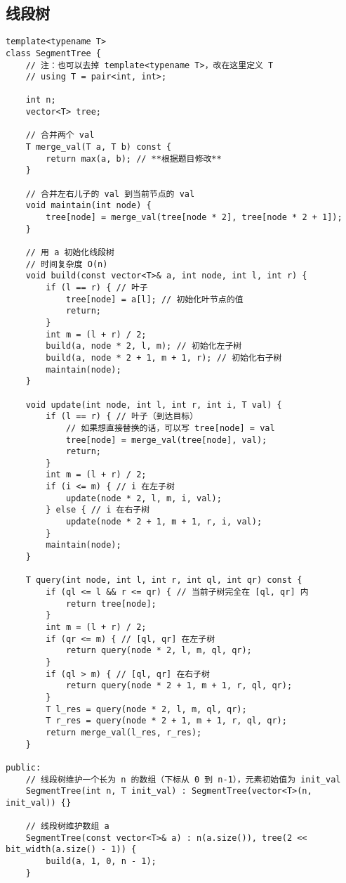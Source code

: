\documentclass[12pt,a4paper,UTF16]{ctexbook}
\theoremstyle{plain}
\begin{document}
\subsection{线段树}
\begin{lstlisting}
template<typename T>
class SegmentTree {
    // 注：也可以去掉 template<typename T>，改在这里定义 T
    // using T = pair<int, int>;

    int n;
    vector<T> tree;

    // 合并两个 val
    T merge_val(T a, T b) const {
        return max(a, b); // **根据题目修改**
    }

    // 合并左右儿子的 val 到当前节点的 val
    void maintain(int node) {
        tree[node] = merge_val(tree[node * 2], tree[node * 2 + 1]);
    }

    // 用 a 初始化线段树
    // 时间复杂度 O(n)
    void build(const vector<T>& a, int node, int l, int r) {
        if (l == r) { // 叶子
            tree[node] = a[l]; // 初始化叶节点的值
            return;
        }
        int m = (l + r) / 2;
        build(a, node * 2, l, m); // 初始化左子树
        build(a, node * 2 + 1, m + 1, r); // 初始化右子树
        maintain(node);
    }

    void update(int node, int l, int r, int i, T val) {
        if (l == r) { // 叶子（到达目标）
            // 如果想直接替换的话，可以写 tree[node] = val
            tree[node] = merge_val(tree[node], val);
            return;
        }
        int m = (l + r) / 2;
        if (i <= m) { // i 在左子树
            update(node * 2, l, m, i, val);
        } else { // i 在右子树
            update(node * 2 + 1, m + 1, r, i, val);
        }
        maintain(node);
    }

    T query(int node, int l, int r, int ql, int qr) const {
        if (ql <= l && r <= qr) { // 当前子树完全在 [ql, qr] 内
            return tree[node];
        }
        int m = (l + r) / 2;
        if (qr <= m) { // [ql, qr] 在左子树
            return query(node * 2, l, m, ql, qr);
        }
        if (ql > m) { // [ql, qr] 在右子树
            return query(node * 2 + 1, m + 1, r, ql, qr);
        }
        T l_res = query(node * 2, l, m, ql, qr);
        T r_res = query(node * 2 + 1, m + 1, r, ql, qr);
        return merge_val(l_res, r_res);
    }

public:
    // 线段树维护一个长为 n 的数组（下标从 0 到 n-1），元素初始值为 init_val
    SegmentTree(int n, T init_val) : SegmentTree(vector<T>(n, init_val)) {}

    // 线段树维护数组 a
    SegmentTree(const vector<T>& a) : n(a.size()), tree(2 << bit_width(a.size() - 1)) {
        build(a, 1, 0, n - 1);
    }


\end{lstlisting}
\end{document}
